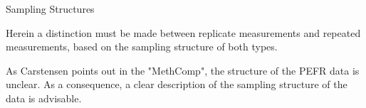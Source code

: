 Sampling Structures

Herein a distinction must be made between replicate measurements and repeated measurements, based on the sampling structure of both types.

As Carstensen points out in the "MethComp", the structure of the PEFR data is unclear.
As a consequence, a clear description of the sampling structure of the data is advisable.


